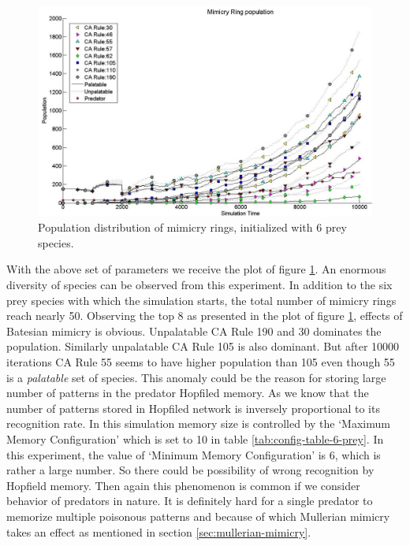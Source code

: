 \documentclass[letterpaper]{article}
\numberwithin{equation}{section}
\begin{document}
\begin{figure}[H]
	\centering
	\includegraphics[scale=0.45]{../tex/images/simTime10k-6Prey}
	\caption[Population distribution of mimicry rings (6 prey species)]{Population distribution of mimicry rings, initialized with 6 prey species.}
	\label{fig:plot-6-prey}
\end{figure}

With the above set of parameters we receive the plot of figure \ref{fig:plot-6-prey}. An enormous diversity of species can be observed from this experiment. In addition to the six prey species with which the simulation starts, the total number of mimicry rings reach nearly 50. Observing the top 8 as presented in the plot of figure \ref{fig:plot-6-prey}, effects of Batesian mimicry is obvious. Unpalatable CA Rule 190 and 30 dominates the population. Similarly unpalatable CA Rule 105 is also dominant. But after 10000 iterations CA Rule 55 seems to have higher population than 105 even though 55 is a \textsl{palatable} set of species. This anomaly could be the reason for storing large number of patterns in the predator Hopfiled memory. As we know that the number of patterns stored in Hopfiled network is inversely proportional to its recognition rate. In this simulation memory size is controlled by the `Maximum Memory Configuration' which is set to 10 in table \ref{tab:config-table-6-prey}. In this experiment, the value of `Minimum Memory Configuration' is 6, which is rather a large number. So there could be possibility of wrong recognition by Hopfield memory. Then again this phenomenon is common if we consider behavior of predators in nature. It is definitely hard for a single predator to memorize multiple poisonous patterns and because of which Mullerian mimicry takes an effect as mentioned in section \ref{sec:mullerian-mimicry}.
\end{document}
